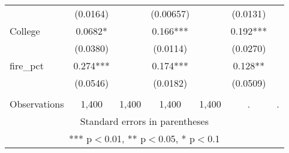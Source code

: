 \begin{tabular}{lcccccc}
 & (0.0164) &  & (0.00657) &  & (0.0131) &  \\
College & 0.0682* &  & 0.166*** &  & 0.192*** &  \\
 & (0.0380) &  & (0.0114) &  & (0.0270) &  \\
fire\_pct & 0.274*** &  & 0.174*** &  & 0.128** &  \\
 & (0.0546) &  & (0.0182) &  & (0.0509) &  \\
 &  &  &  &  &  &  \\
 Observations & 1,400 & 1,400 & 1,400 & 1,400 & . & . \\ \hline
\multicolumn{7}{c}{ Standard errors in parentheses} \\
\multicolumn{7}{c}{ *** p$<$0.01, ** p$<$0.05, * p$<$0.1} \\
\end{tabular}
